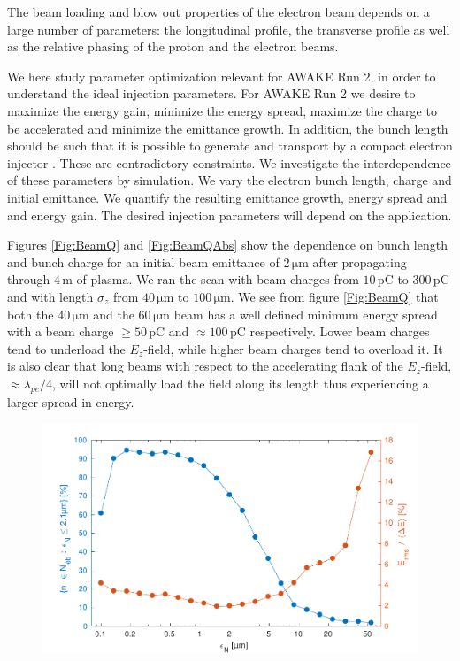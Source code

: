 \documentclass[aps,prstab,reprint,amsmath,amssymb,groupedaddress]{revtex4-1}
\newcommand{\unit}[1]{\,\mathrm{#1}}
\begin{document}
The beam loading and blow out properties of the electron beam depends on a large number of parameters: the longitudinal
profile, the transverse profile as well as the relative phasing of the proton and the electron beams.

We here study parameter optimization relevant for AWAKE Run 2, in order to understand the ideal injection parameters.
For AWAKE Run 2 we desire to maximize the energy gain, minimize the energy spread, maximize the charge to be accelerated
and minimize the emittance growth. In addition, the bunch length should be such that it is possible to generate and
transport by a compact electron injector \cite{adli:2016}. These are contradictory constraints. We  investigate the
interdependence of these parameters by simulation. We vary the electron bunch length, charge and initial emittance. We
quantify the resulting emittance growth, energy spread and and energy gain. The desired injection parameters will depend
on the application.

Figures \ref{Fig:BeamQ} and \ref{Fig:BeamQAbs} show the dependence on bunch length and bunch charge for an initial beam
emittance of $2\unit{\mu m}$ after propagating through $4\unit{m}$ of plasma. We ran the scan with beam charges from
$10\unit{pC}$ to $300\unit{pC}$ and with length $\sigma_{z}$ from $40\unit{\mu m}$ to $100\unit{\mu m}$. We see from
figure \ref{Fig:BeamQ} that both the $40\unit{\mu m}$ and the $60\unit{\mu m}$ beam has a well defined minimum energy
spread with a beam charge $\geq 50\unit{pC}$ and $\approx 100\unit{pC}$ respectively. Lower beam charges tend to
underload the $E_{z}$-field, while higher beam charges tend to overload it. It is also clear that long beams with
respect to the accelerating flank of the $E_{z}$-field, $\approx\lambda_{pe}/4$, will not optimally load the field along
its length thus experiencing a larger spread in energy.

\begin{figure}[hbt]
    \includegraphics[width=\linewidth,trim={2mm 0mm 2mm 0mm},clip]{figures/beamQualityEmittance}
    \caption{\label{Fig:BeamQEmit} }
\end{figure}
\end{document}
